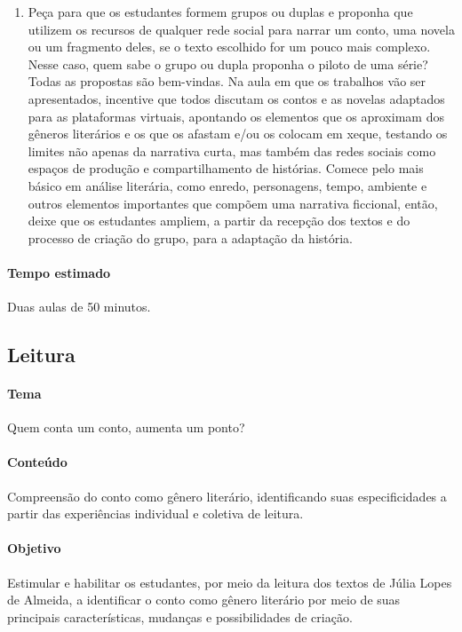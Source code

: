 \documentclass[12pt]{extarticle}
\begin{document}
\begin{enumerate}
\item
Peça para que os estudantes formem grupos ou duplas e proponha que
utilizem os recursos de qualquer rede social para narrar um conto, uma
novela ou um fragmento deles, se o texto escolhido for um pouco mais
complexo. Nesse caso, quem sabe o grupo ou dupla proponha o piloto de
uma série? Todas as propostas são bem-vindas. Na aula em que os
trabalhos vão ser apresentados, incentive que todos discutam os contos e
as novelas adaptados para as plataformas virtuais, apontando os
elementos que os aproximam dos gêneros literários e os que os afastam
e/ou os colocam em xeque, testando os limites não apenas da narrativa
curta, mas também das redes sociais como espaços de produção e
compartilhamento de histórias. Comece pelo mais básico em análise
literária, como enredo, personagens, tempo, ambiente e outros elementos
importantes que compõem uma narrativa ficcional, então, deixe que os
estudantes ampliem, a partir da recepção dos textos e do processo de
criação do grupo, para a adaptação da história.
\end{enumerate}

\paragraph{Tempo estimado} Duas aulas de 50 minutos.



\subsection{Leitura}


\paragraph{Tema} Quem conta um conto, aumenta um ponto?

\paragraph{Conteúdo} Compreensão do conto como gênero literário,
identificando suas especificidades a partir das experiências individual
e coletiva de leitura.

\paragraph{Objetivo} Estimular e habilitar os estudantes, por meio da
leitura dos textos de Júlia Lopes de Almeida, a identificar o conto como
gênero literário por meio de suas principais características, mudanças e
possibilidades de criação.
\end{document}
